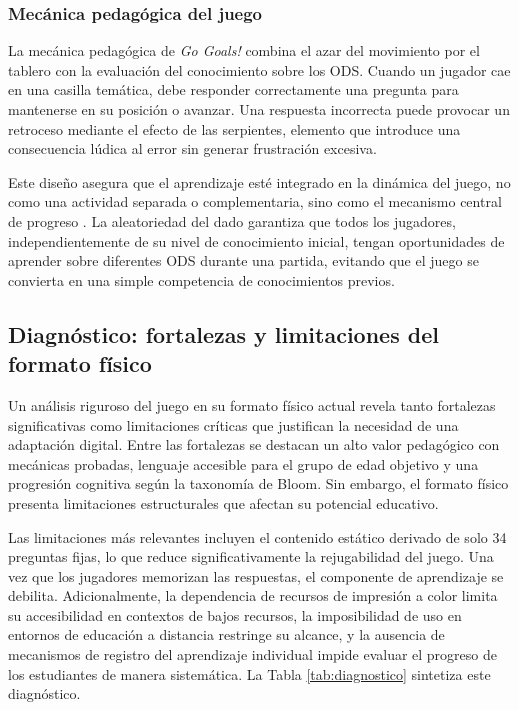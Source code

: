 \subsubsection{Mecánica pedagógica del juego}
\label{subsubsec:mecanica_pedagogica}

La mecánica pedagógica de \textit{Go Goals!} combina el azar del movimiento por el tablero con la evaluación del conocimiento sobre los ODS. Cuando un jugador cae en una casilla temática, debe responder correctamente una pregunta para mantenerse en su posición o avanzar. Una respuesta incorrecta puede provocar un retroceso mediante el efecto de las serpientes, elemento que introduce una consecuencia lúdica al error sin generar frustración excesiva.

Este diseño asegura que el aprendizaje esté integrado en la dinámica del juego, no como una actividad separada o complementaria, sino como el mecanismo central de progreso \parencite{GoGoals2020}. La aleatoriedad del dado garantiza que todos los jugadores, independientemente de su nivel de conocimiento inicial, tengan oportunidades de aprender sobre diferentes ODS durante una partida, evitando que el juego se convierta en una simple competencia de conocimientos previos.

\subsection{Diagnóstico: fortalezas y limitaciones del formato físico}
\label{subsec:diagnostico_gogals}

Un análisis riguroso del juego en su formato físico actual revela tanto fortalezas significativas como limitaciones críticas que justifican la necesidad de una adaptación digital. Entre las fortalezas se destacan un alto valor pedagógico con mecánicas probadas, lenguaje accesible para el grupo de edad objetivo y una progresión cognitiva según la taxonomía de Bloom. Sin embargo, el formato físico presenta limitaciones estructurales que afectan su potencial educativo.

Las limitaciones más relevantes incluyen el contenido estático derivado de solo 34 preguntas fijas, lo que reduce significativamente la rejugabilidad del juego. Una vez que los jugadores memorizan las respuestas, el componente de aprendizaje se debilita. Adicionalmente, la dependencia de recursos de impresión a color limita su accesibilidad en contextos de bajos recursos, la imposibilidad de uso en entornos de educación a distancia restringe su alcance, y la ausencia de mecanismos de registro del aprendizaje individual impide evaluar el progreso de los estudiantes de manera sistemática. La Tabla \ref{tab:diagnostico} sintetiza este diagnóstico.

